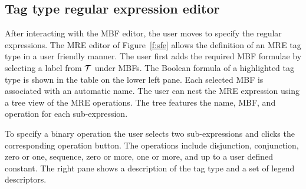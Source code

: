 \subsection{Tag type regular expression editor}
\vspace{-1em}

After interacting with the MBF editor, the user moves to 
specify the regular expressions. 
The MRE editor of Figure~\ref{f:sfe} allows the 
definition of an MRE tag type in a user friendly manner. 
The user first adds the required MBF formulae 
by selecting a label from ${\cal T}$ under MBFs. 
The Boolean formula of a highlighted tag type is shown in the table on the lower left pane. 
Each selected MBF is associated with an automatic name. 
The user can nest the MRE expression using a tree view of the MRE operations. 
The tree features the name, MBF, and operation for each sub-expression. 


To specify a binary operation the user selects two sub-expressions and clicks the corresponding
operation button. 
The operations include disjunction, conjunction, zero or one, sequence, zero or more, 
one or more, and up to a user defined constant.
The right pane shows a description of the tag type and a set of legend 
descriptors. 

%

